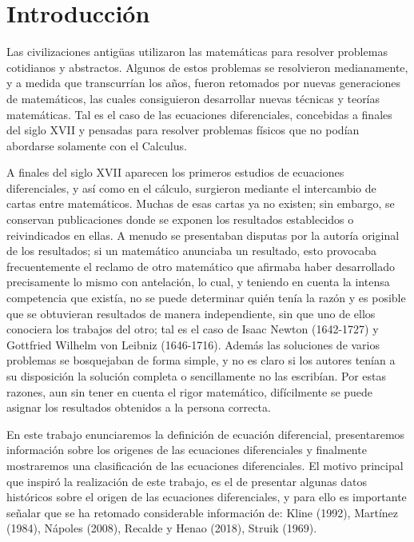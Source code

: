 \documentclass[12pt,a4paper,oneside]{book}
\begin{document}
\tableofcontents
	
	\chapter*{Introducci\'on}
    \noindent
    Las civilizaciones antigüas utilizaron las matemáticas para resolver problemas cotidianos y abstractos. Algunos de estos problemas se resolvieron medianamente, y a medida que transcurrían los años, fueron retomados por nuevas generaciones de matemáticos, las cuales consiguieron desarrollar nuevas técnicas y teorías matemáticas. Tal es el caso de las ecuaciones diferenciales, concebidas a finales del siglo XVII y pensadas para resolver problemas físicos que no podían abordarse solamente con el Calculus.
    
	\medskip
	\noindent
	A finales del siglo XVII aparecen los primeros estudios de ecuaciones diferenciales, y así como en el cálculo, surgieron mediante el intercambio de cartas entre matemáticos. Muchas de esas cartas ya no existen; sin embargo, se conservan publicaciones donde se exponen los resultados establecidos o reivindicados en ellas. A menudo se presentaban disputas por la autoría original de los resultados; si un matemático anunciaba un resultado, esto provocaba frecuentemente el reclamo de otro matemático que afirmaba haber desarrollado precisamente lo mismo con antelación, lo cual, y teniendo en cuenta la intensa competencia que existía, no se puede determinar quién tenía la razón y es posible que se obtuvieran resultados de manera independiente, sin que uno de ellos conociera los trabajos del otro; tal es el caso de Isaac Newton (1642-1727) y Gottfried Wilhelm von Leibniz (1646-1716). Además las soluciones de varios problemas se bosquejaban de forma simple, y no es claro si los autores tenían a su disposición la solución completa o sencillamente no las escribían. Por estas razones, aun sin tener en cuenta el rigor matemático, difícilmente se puede asignar los resultados obtenidos a la persona correcta.
	
	\medskip
	\noindent
	En este trabajo enunciaremos la definición de ecuación diferencial, presentaremos información sobre los origenes de las ecuaciones diferenciales y finalmente mostraremos una clasificación de las ecuaciones diferenciales. El motivo principal que inspiró la realización de este trabajo, es el de presentar algunas datos históricos sobre el origen de las ecuaciones diferenciales, y para ello es importante señalar que se ha retomado considerable información de: Kline (1992), Martínez (1984), Nápoles (2008), Recalde y Henao (2018), Struik (1969).
\end{document}
